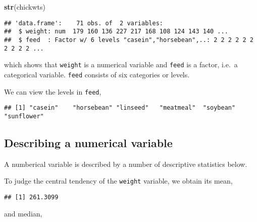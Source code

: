 \documentclass[]{book}
\newenvironment{Shaded}{\begin{snugshade}}{\end{snugshade}}
\newcommand{\KeywordTok}[1]{\textcolor[rgb]{0.13,0.29,0.53}{\textbf{{#1}}}}
\newcommand{\NormalTok}[1]{{#1}}
\theoremstyle{definition}
\theoremstyle{definition}
\theoremstyle{remark}
\begin{document}
\begin{Shaded}
\begin{Highlighting}[]
\KeywordTok{str}\NormalTok{(chickwts)}
\end{Highlighting}
\end{Shaded}

\begin{verbatim}
## 'data.frame':    71 obs. of  2 variables:
##  $ weight: num  179 160 136 227 217 168 108 124 143 140 ...
##  $ feed  : Factor w/ 6 levels "casein","horsebean",..: 2 2 2 2 2 2 2 2 2 2 ...
\end{verbatim}

which shows that \texttt{weight} is a numerical variable and
\texttt{feed} is a factor, i.e.~a categorical variable. \texttt{feed}
consists of six categories or levels.

We can view the levels in \texttt{feed},

\begin{Shaded}
\end{Shaded}

\begin{verbatim}
## [1] "casein"    "horsebean" "linseed"   "meatmeal"  "soybean"   "sunflower"
\end{verbatim}

\subsection{Describing a numerical
variable}\label{describing-a-numerical-variable}

A numberical variable is described by a number of descriptive statistics
below.

To judge the central tendency of the \texttt{weight} variable, we obtain
its mean,

\begin{Shaded}
\end{Shaded}

\begin{verbatim}
## [1] 261.3099
\end{verbatim}

and median,

\begin{Shaded}
\end{Shaded}
\end{document}
